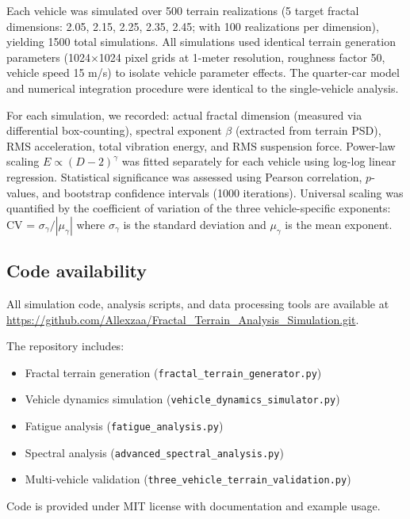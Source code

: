 \documentclass[11pt]{article}
\begin{document}
Each vehicle was simulated over 500 terrain realizations (5 target fractal dimensions: 2.05, 2.15, 2.25, 2.35, 2.45; with 100 realizations per dimension), yielding 1500 total simulations. All simulations used identical terrain generation parameters (1024$\times$1024 pixel grids at 1-meter resolution, roughness factor 50, vehicle speed 15 m/s) to isolate vehicle parameter effects. The quarter-car model and numerical integration procedure were identical to the single-vehicle analysis.

For each simulation, we recorded: actual fractal dimension (measured via differential box-counting), spectral exponent $\beta$ (extracted from terrain PSD), RMS acceleration, total vibration energy, and RMS suspension force. Power-law scaling $E \propto (D-2)^\gamma$ was fitted separately for each vehicle using log-log linear regression. Statistical significance was assessed using Pearson correlation, $p$-values, and bootstrap confidence intervals (1000 iterations). Universal scaling was quantified by the coefficient of variation of the three vehicle-specific exponents: CV = $\sigma_\gamma / |\mu_\gamma|$ where $\sigma_\gamma$ is the standard deviation and $\mu_\gamma$ is the mean exponent.

\subsection*{Code availability}

All simulation code, analysis scripts, and data processing tools are available at \url{https://github.com/Allexzaa/Fractal_Terrain_Analysis_Simulation.git}. 

The repository includes: 
\begin{itemize}
\item Fractal terrain generation (\texttt{fractal\_\allowbreak terrain\_\allowbreak generator.py})
\item Vehicle dynamics simulation (\texttt{vehicle\_\allowbreak dynamics\_\allowbreak simulator.py})
\item Fatigue analysis (\texttt{fatigue\_\allowbreak analysis.py})
\item Spectral analysis (\texttt{advanced\_\allowbreak spectral\_\allowbreak analysis.py})
\item Multi-vehicle validation (\texttt{three\_\allowbreak vehicle\_\allowbreak terrain\_\allowbreak validation.py})
\end{itemize}

Code is provided under MIT license with documentation and example usage.
\end{document}
